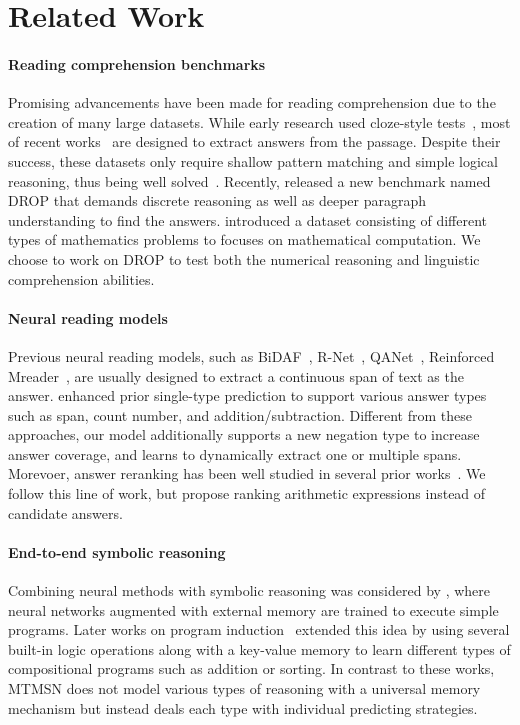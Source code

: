 \documentclass[11pt,a4paper]{article}
\begin{document}
 \section{Related Work}
\paragraph{Reading comprehension benchmarks}
Promising advancements have been made for reading comprehension due to the creation of many large datasets.
While early research used cloze-style tests~\cite{hermann2015teaching,Hill16}, most of recent works~\cite{Rajpurkar16,joshi2017triviaqa} are designed to extract answers from the passage.
Despite their success, these datasets only require shallow pattern matching and simple logical reasoning, thus being well solved~\cite{chen2016thorough,devlin2018bert}.
Recently, \citet{dua2019drop} released a new benchmark named DROP that demands discrete reasoning as well as deeper paragraph understanding to find the answers.
\citet{saxton2019analysing} introduced a dataset consisting of different types of mathematics problems to focuses on mathematical computation.
We choose to work on DROP to test both the numerical reasoning and linguistic comprehension abilities.

\paragraph{Neural reading models}
Previous neural reading models, such as BiDAF~\cite{seo2016bidirectional}, R-Net~\cite{wang2017gated}, QANet~\cite{yu2018fast}, Reinforced Mreader~\cite{hu2017reinforced}, are usually designed to extract a continuous span of text as the answer.
\citet{dua2019drop} enhanced prior single-type prediction to support various answer types such as span, count number, and addition/subtraction.
Different from these approaches, our model additionally supports a new negation type to increase answer coverage, and learns to dynamically extract one or multiple spans.
Morevoer, answer reranking has been well studied in several prior works~\cite{cui2016attention,wang2017evidence,wang2018multi,wang2018joint,hu2019retrieve}.
We follow this line of work, but propose ranking arithmetic expressions instead of candidate answers.

\paragraph{End-to-end symbolic reasoning}
Combining neural methods with symbolic reasoning was considered by \citet{graves2014neural,sukhbaatar2015end}, where neural networks augmented with external memory are trained to execute simple programs. 
Later works on program induction~\cite{reed2015neural,neelakantan2015neural,liang2016neural} extended this idea by using several built-in logic operations along with a key-value memory to learn different types of compositional programs such as addition or sorting.
In contrast to these works, MTMSN does not model various types of reasoning with a universal memory mechanism but instead deals each type with individual predicting strategies.
\end{document}
